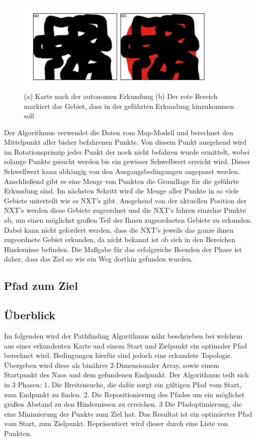 \begin{figure}[ht]
    \centering
  \includegraphics[width=0.9\textwidth, angle=0]{img/guided_exploration_1.png}
    \caption{(a) Karte nach der autonomen Erkundung (b) Der rote Bereich markiert das Gebiet, dass in der geführten Erkundung hinzukommen soll}
    \label{guidedexploration}
\end{figure}

Der Algorithmus verwendet die Daten vom Map-Modell und berechnet den Mittelpunkt aller bisher befahrenen Punkte. Von diesem Punkt ausgehend wird im Rotationsprinzip jeder Punkt der noch nicht befahren wurde ermittelt, wobei solange Punkte gesucht werden bis ein gewisser Schwellwert erreicht wird. Dieser Schwellwert kann abhängig von den Ausgangsbedingungen angepasst werden. Anschließend gibt es eine Menge von Punkten die Grundlage für die geführte Erkundung sind. Im nächsten Schritt wird die Menge aller Punkte in so viele Gebiete unterteilt wie es NXT's gibt. Ausgehend von der aktuellen Position der NXT's werden diese Gebiete zugeordnet und die NXT's fahren einzelne Punkte ab, um einen möglichst großen Teil der Ihnen zugeordneten Gebiete zu erkunden. Dabei kann nicht gefordert werden, dass die NXT's jeweils das ganze ihnen zugeordnete Gebiet erkunden, da nicht bekannt ist ob sich in den Bereichen Hindernisse befinden. Die Maßgabe für das erfolgreiche Beenden der Phase ist daher, dass das Ziel so wie ein Weg dorthin gefunden wurden. 

\subsection{Pfad zum Ziel}
\subsection*{Überblick}
	Im folgenden wird der Pathfinding Algorithmus nähr beschrieben bei welchem aus einer erkundenten Karte und einem Start und Zielpunkt ein optimaler Pfad berechnet wird. Bedingungen hierfür sind jedoch eine erkundete Topologie. Übergeben wird diese als binährer 2-Dimensionaler Array, sowie einem Startpunkt des Naos und dem gefundenen Endpunkt. Der Algorithmus teilt sich in 3 Phasen: 1. Die Breitensuche, die dafür sorgt ein gültigen Pfad vom Start, zum Endpunkt zu finden. 2. Die Repositionierung des Pfades um ein möglichst großen Abstand zu den Hindernissen zu erreichen. 3 Die Pfadoptimierung, die eine Minimierung der Punkte zum Ziel hat. Das Resultat ist ein optimierter Pfad vom Start, zum Zielpunkt. Repräsentiert wird dieser durch eine Liste von Punkten.
